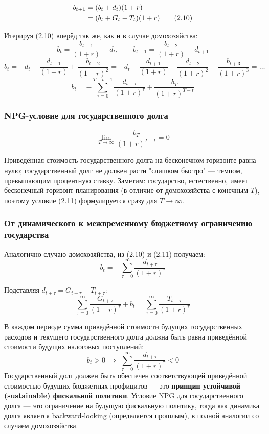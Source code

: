 \documentclass[10pt,a4paper]{article}
\begin{document}
\begin{align}
b_{t+1} &= (b_t + d_t)(1+r)\notag\\
&= (b_t + G_t - T_t)(1+r) \tag{2.10}
\end{align}
 
Итерируя (2.10) вперёд так же, как и в случае домохозяйства:
\[
b_t = \frac{b_{t+1}}{(1+r)} - d_t,\qquad b_{t+1} = \frac{b_{t+2}}{(1+r)} - d_{t+1}
\]
\[
b_t = -d_t - \frac{d_{t+1}}{(1+r)} + \frac{b_{t+2}}{(1+r)^2} = -d_t - \frac{d_{t+1}}{(1+r)} - \frac{d_{t+2}}{(1+r)^2} + \frac{b_{t+3}}{(1+r)^3} = \dots
\]
\[
b_t = -\sum_{\tau=0}^{T-t-1}\frac{d_{t+\tau}}{(1+r)^\tau} + \frac{b_T}{(1+r)^{T-t}}
\]
 
\subsubsection{NPG-условие для государственного долга}
 
\begin{equation}
\lim_{T\to\infty}\frac{b_T}{(1+r)^{T-t}} = 0 \tag{2.11}
\end{equation}
 
\begin{intuition}
Приведённая стоимость государственного долга на бесконечном горизонте равна нулю; государственный долг не должен расти "слишком быстро" — темпом, превышающим процентную ставку. Заметим: государство, естественно, имеет бесконечный горизонт планирования (в отличие от домохозяйства с конечным $T$), поэтому условие (2.11) формулируется сразу для $T\to\infty$.
\end{intuition}
 
\subsubsection{От динамического к межвременному бюджетному ограничению государства}
 
Аналогично случаю домохозяйства, из (2.10) и (2.11) получаем:
\begin{equation}
b_t = -\sum_{\tau=0}^{\infty}\frac{d_{t+\tau}}{(1+r)^\tau} \tag{2.12}
\end{equation}
 
Подставляя $d_{t+\tau} = G_{t+\tau} - T_{t+\tau}$:
\begin{equation}
\sum_{\tau=0}^{\infty}\frac{G_{t+\tau}}{(1+r)^\tau} + b_t = \sum_{\tau=0}^{\infty}\frac{T_{t+\tau}}{(1+r)^\tau} \tag{2.13}
\end{equation}
 
\begin{intuition}
В каждом периоде сумма приведённой стоимости будущих государственных расходов и текущего государственного долга должна быть равна приведённой стоимости будущих налоговых поступлений:
\[
b_t > 0 \;\Rightarrow\; \sum_{\tau=0}^{\infty}\frac{d_{t+\tau}}{(1+r)^\tau} < 0
\]
Государственный долг должен быть обеспечен соответствующей приведённой стоимостью будущих бюджетных профицитов — это \textbf{принцип устойчивой (sustainable) фискальной политики}. Условие NPG для государственного долга — это ограничение на будущую фискальную политику, тогда как динамика долга является backward-looking (определяется прошлым), в полной аналогии со случаем домохозяйства.
\end{intuition}
 
\end{document}
